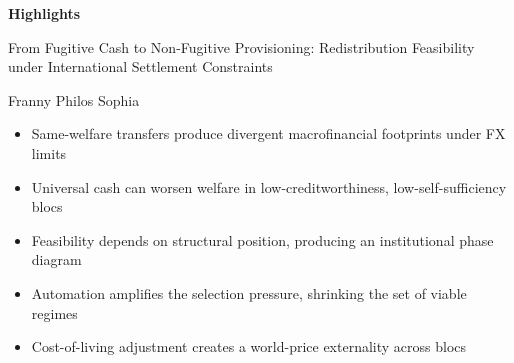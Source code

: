 \documentclass[12pt]{article}
\begin{document}
\begin{center}
{\large\bfseries Highlights}

\medskip
From Fugitive Cash to Non-Fugitive Provisioning: Redistribution Feasibility under International Settlement Constraints

\medskip
Franny Philos Sophia
\end{center}

\bigskip

\begin{itemize}[leftmargin=1.5em, itemsep=0.6em]
\item Same-welfare transfers produce divergent macrofinancial footprints under FX limits
\item Universal cash can worsen welfare in low-creditworthiness, low-self-sufficiency blocs
\item Feasibility depends on structural position, producing an institutional phase diagram
\item Automation amplifies the selection pressure, shrinking the set of viable regimes
\item Cost-of-living adjustment creates a world-price externality across blocs
\end{itemize}
\end{document}
